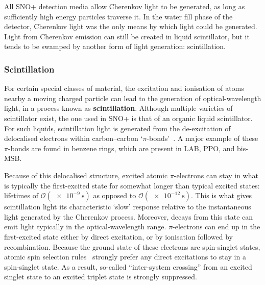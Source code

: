All SNO+ detection media allow Cherenkov light to be generated, as long as sufficiently high energy particles traverse it. In the water fill phase of the detector, Cherenkov light was the only means by which light could be generated. Light from Cherenkov emission can still be created in liquid scintillator, but it tends to be swamped by another form of light generation: scintillation.
\subsubsection{Scintillation}\label{sec:scintillation}
For certain special classes of material, the excitation and ionisation of atoms nearby a moving charged particle can lead to the generation of optical-wavelength light, in a process known as \textbf{scintillation}. Although multiple varieties of scintillator exist, the one used in SNO+ is that of an organic liquid scintillator. For such liquids, scintillation light is generated from the de-excitation of delocalised electrons within carbon--carbon `$\pi$-bonds'~\cite{birksChapterScintillationProcess1967}. A major example of these $\pi$-bonds are found in benzene rings, which are present in LAB, PPO, and bis-MSB.

Because of this delocalised structure, excited atomic $\pi$-electrons can stay in what is typically the first-excited state for somewhat longer than typical excited states: lifetimes of $\mathcal{O}(\SI{e-9}{\second})$ as opposed to $\mathcal{O}(\SI{e-12}{\second})$. This is what gives scintillation light its characteristic `slow' response relative to the instantaneous light generated by the Cherenkov process. Moreover, decays from this state can emit light typically in the optical-wavelength range. 
$\pi$-electrons can end up in the first-excited state either by direct excitation, or by ionisation followed by recombination. Because the ground state of these electrons are spin-singlet states, atomic spin selection rules~\cite{birksChapterScintillationProcess1967} strongly prefer any direct excitations to stay in a spin-singlet state. As a result, so-called ``inter-system crossing'' from an excited singlet state to an excited triplet state is strongly suppressed.

